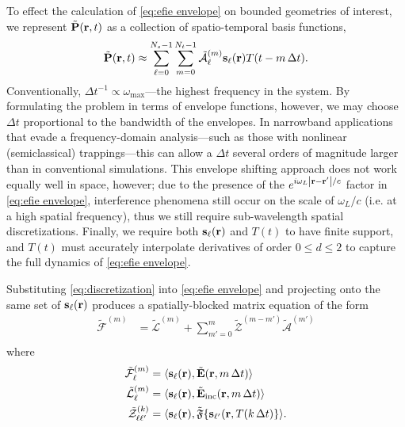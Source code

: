 To effect the calculation of \cref{eq:efie envelope} on bounded geometries of interest, we represent $\tilde{\vb{P}}(\vb{r}, t)$ as a collection of spatio-temporal basis functions,
\begin{equation}
  \tilde{\vb{P}}(\vb{r}, t) \approx \sum_{\ell = 0}^{N_s - 1} \sum_{m = 0}^{N_t - 1} \tilde{\mathcal{A}}_\ell^{(m)} \vb{s}_\ell(\vb{r}) T(t - m \, \Delta t).
  \label{eq:discretization}
\end{equation}
Conventionally, $\Delta t^{-1} \propto \omega_\text{max}$---the highest frequency in the system.
By formulating the problem in terms of envelope functions, however, we may choose $\Delta t$ proportional to the bandwidth of the envelopes.
In narrowband applications that evade a frequency-domain analysis---such as those with nonlinear (semiclassical) trappings---this can allow a $\Delta t$ several orders of magnitude larger than in conventional simulations.
This envelope shifting approach does not work equally well in space, however; due to the presence of the $e^{i \omega_L \abs{\vb{r} - \vb{r}'}/c}$ factor in \cref{eq:efie envelope}, interference phenomena still occur on the scale of $\omega_L/c$ (i.e. at a high spatial frequency), thus we still require sub-wavelength spatial discretizations.
Finally, we require both $\vb{s}_\ell(\vb{r})$ and $T(t)$ to have finite support, and $T(t)$ must accurately interpolate derivatives of order $0 \leqslant d \leqslant 2$ to capture the full dynamics of \cref{eq:efie envelope}.

Substituting \cref{eq:discretization} into \cref{eq:efie envelope} and projecting onto the same set of $\vb{s}_\ell(\vb{r})$ produces a spatially-blocked matrix equation of the form
\begin{equation}
  \begin{aligned}
    \tilde{\mathcal{F}}^{(m)} &= \tilde{\mathcal{L}}^{(m)} + \sum_{m'= 0}^m \tilde{\mathcal{Z}}^{(m - m')} \tilde{\mathcal{A}}^{(m')} \\
  \end{aligned}
  \label{eq:mot}
\end{equation}
where
\begin{subequations}
  \begin{align}
    \tilde{\mathcal{F}}^{(m)}_\ell &= \langle \vb{s}_\ell(\vb{r}), \tilde{\vb{E}}(\vb{r}, m \, \Delta t) \rangle \label{eq:f elements}\\
    \tilde{\mathcal{L}}^{(m)}_\ell &= \langle \vb{s}_\ell(\vb{r}), \tilde{\vb{E}}_\text{inc}(\vb{r}, m \, \Delta t) \rangle \label{eq:l elements}\\
    \tilde{\mathcal{Z}}^{(k)}_{\ell\ell'} &= \langle \vb{s}_\ell(\vb{r}), \tilde{\mathfrak{F}}\qty{\vb{s}_{\ell'}(\vb{r}, T(k \, \Delta t)} \rangle \label{eq:z elements}.
  \end{align}
\end{subequations}


